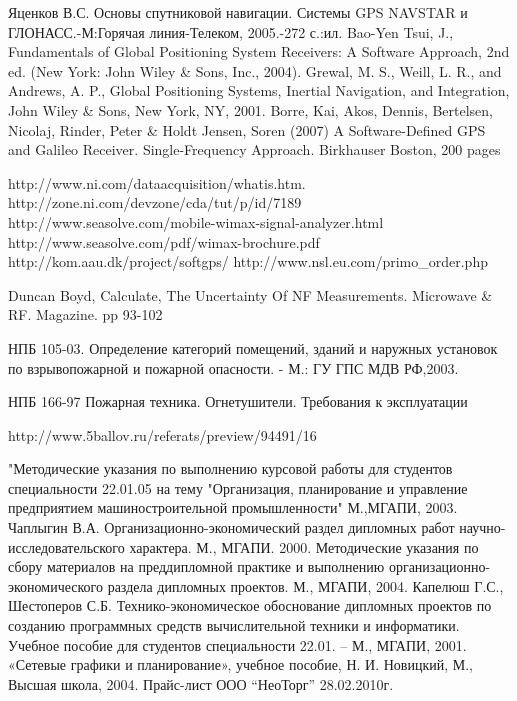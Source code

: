 
\begin{thebibliography}{99}
 Яценков В.С. Основы спутниковой навигации. Системы GPS NAVSTAR и ГЛОНАСС.-М:Горячая линия-Телеком, 2005.-272 с.:ил.
 Bao-Yen Tsui, J., Fundamentals of Global Positioning System Receivers: A Software Approach, 2nd ed. (New York: John Wiley \& Sons, Inc., 2004).
 Grewal, M. S., Weill, L. R., and Andrews, A. P., Global Positioning Systems, Inertial Navigation, and Integration, John Wiley \& Sons, New York, NY, 2001.
 Borre, Kai, Akos, Dennis, Bertelsen, Nicolaj, Rinder, Peter \& Holdt Jensen, Soren (2007) A Software-Defined GPS and Galileo Receiver. Single-Frequency Approach. Birkhauser Boston, 200 pages

 http://www.ni.com/dataacquisition/whatis.htm.
 http://zone.ni.com/devzone/cda/tut/p/id/7189
 http://www.seasolve.com/mobile-wimax-signal-analyzer.html
 http://www.seasolve.com/pdf/wimax-brochure.pdf
 http://kom.aau.dk/project/softgps/
 http://www.nsl.eu.com/primo\_order.php

 Duncan Boyd,  Calculate, The Uncertainty Of NF Measurements. Microwave \& RF. Magazine. pp 93-102



 НПБ 105-03. Определение категорий помещений, зданий и наружных установок по
взрывопожарной и пожарной опасности. - М.: ГУ ГПС МДВ РФ,2003.

 НПБ 166-97 Пожарная техника. Огнетушители. Требования к эксплуатации 

 http://www.5ballov.ru/referats/preview/94491/16

 "Методические указания по выполнению курсовой работы для студентов специальности 22.01.05
	на тему "Организация, планирование и управление предприятием машиностроительной промышленности" М.,МГАПИ, 2003.
 Чаплыгин В.А. Организационно-экономический раздел дипломных работ научно-исследовательского характера. М., МГАПИ. 2000.
 Методические указания по сбору материалов на преддипломной практике и выполнению организационно-экономического
	раздела дипломных проектов. М., МГАПИ, 2004.
 Капелюш Г.С., Шестоперов С.Б. Технико-экономическое обоснование дипломных проектов по созданию программных средств
	вычислительной техники и информатики. Учебное пособие для студентов специальности 22.01. – М., МГАПИ, 2001.
 «Сетевые графики и планирование», учебное пособие, Н. И. Новицкий, М., Высшая школа, 2004.
 Прайс-лист ООО “НеоТорг” 28.02.2010г.


\end{thebibliography}
